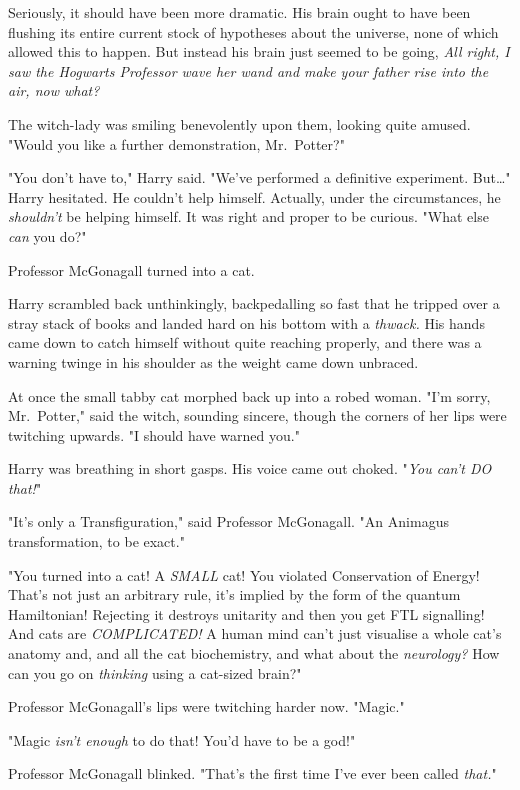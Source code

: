 Seriously, it should have been more dramatic. His brain ought to have been 
flushing its entire current stock of hypotheses about the universe, none of 
which allowed this to happen. But instead his brain just seemed to be going, 
\emph{All right, I saw the Hogwarts Professor wave her wand and make your 
father rise into the air, now what?}

The witch-lady was smiling benevolently upon them, looking quite amused. "Would 
you like a further demonstration, Mr.~Potter?"

"You don't have to," Harry said. "We've performed a definitive experiment. 
But{\ldots}" Harry hesitated. He couldn't help himself. Actually, under the 
circumstances, he \emph{shouldn't} be helping himself. It was right and proper 
to be curious. "What else \emph{can} you do?"

Professor McGonagall turned into a cat.

Harry scrambled back unthinkingly, backpedalling so fast that he tripped over a 
stray stack of books and landed hard on his bottom with a \emph{thwack.} His 
hands came down to catch himself without quite reaching properly, and there was 
a warning twinge in his shoulder as the weight came down unbraced.

At once the small tabby cat morphed back up into a robed woman. "I'm sorry, 
Mr.~Potter," said the witch, sounding sincere, though the corners of her lips 
were twitching upwards. "I should have warned you."

Harry was breathing in short gasps. His voice came out choked. "\emph{You can't 
DO that!}"

"It's only a Transfiguration," said Professor McGonagall. "An Animagus 
transformation, to be exact."

"You turned into a cat! A \emph{SMALL} cat! You violated Conservation of 
Energy! That's not just an arbitrary rule, it's implied by the form of the 
quantum Hamiltonian! Rejecting it destroys unitarity and then you get FTL 
signalling! And cats are \emph{COMPLICATED!} A human mind can't just visualise 
a whole cat's anatomy and, and all the cat biochemistry, and what about the 
\emph{neurology?} How can you go on \emph{thinking} using a cat-sized brain?"

Professor McGonagall's lips were twitching harder now. "Magic."

"Magic \emph{isn't enough} to do that! You'd have to be a god!"

Professor McGonagall blinked. "That's the first time I've ever been called 
\emph{that.}"

